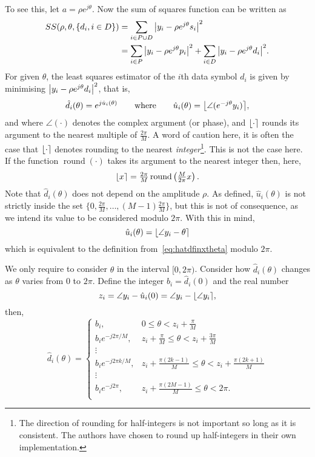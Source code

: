 \documentclass[a4paper,10pt]{article}
\begin{document}
To see this, let $a = \rho e^{j\theta}$.  Now the sum of squares function can be written as
\begin{align*}
SS(\rho, \theta, \{d_i, i \in D\}) &= \sum_{i \in P \cup D} {\left|  y_i - \rho e^{j\theta} s_i  \right|}^2  \\
&= \sum_{i \in P} {\left|  y_i - \rho e^{j\theta} p_i  \right|}^2 + \sum_{i \in D} {\left|  y_i - \rho e^{j\theta} d_i  \right|}^2.
\end{align*}
For given $\theta$, the least squares estimator of the $i$th data symbol $d_i$ is given by minimising ${\left|  y_i - \rho e^{j\theta} d_i  \right|}^2$, that is,
\begin{equation}\label{eq:hatdfinxtheta}
\hat{d}_i(\theta) = e^{j\hat{u}_i(\theta)} \qquad \text{where} \qquad \hat{u}_i(\theta) = {\left\lfloor \angle( e^{-j\theta}y_i) \right\rceil},
\end{equation}
and where $\angle(\cdot)$ denotes the complex argument (or phase), and ${\left\lfloor \cdot \right\rceil}$ rounds its argument to the nearest multiple of $\frac{2\pi}{M}$.  A word of caution here, it is often the case that ${\left\lfloor \cdot \right\rceil}$ denotes rounding to the nearest \emph{integer}\footnote{The direction of rounding for half-integers is not important so long as it is consistent.  The authors have chosen to round up half-integers in their own implementation.}.  This is not the case here.  If the function $\operatorname{round}(\cdot)$ takes its argument to the nearest integer then, here,
\[
{\left\lfloor x \right\rceil} = \tfrac{2\pi}{M}\operatorname{round}\left(\tfrac{M}{2\pi}x\right).
\] 
Note that $\hat{d}_i(\theta)$ does not depend on the amplitude $\rho$.  As defined, $\hat{u}_i(\theta)$ is not strictly inside the set $\{0, \tfrac{2\pi}{M}, \dots, (M-1)\tfrac{2\pi}{M}\}$, but this is not of consequence, as we intend its value to be considered modulo $2\pi$.  With this in mind,
\[
\hat{u}_i(\theta) = {\left\lfloor \angle{y_i} - \theta  \right\rceil}
\]
which is equivalent to the definition from~\eqref{eq:hatdfinxtheta} modulo $2\pi$.

We only require to consider $\theta$ in the interval $[0, 2\pi)$.  Consider how $\hat{d}_i(\theta)$ changes as $\theta$ varies from $0$ to $2\pi$.  Define the integer $b_i = \hat{d}_i(0)$ and the real number 
\[
z_i = \angle{y_i} - \hat{u}_i(0) = \angle{y_i} - {\left\lfloor \angle{y_i} \right\rceil},
\]
then,
\begin{equation}\label{eq:uicombos}
\hat{d}_i(\theta) = 
\begin{cases}
b_i, &  0 \leq \theta < z_i + \frac{\pi}{M} \\
b_i e^{-j2\pi/M}, & z_i + \frac{\pi}{M} \leq \theta < z_i + \frac{3\pi}{M} \\ 
\vdots & \\
b_i e^{-j2\pi k /M}, & z_i + \frac{\pi(2k - 1)}{M} \leq \theta < z_i + \frac{\pi(2k + 1)}{M}  \\ 
\vdots & \\
b_i e^{-j2\pi}, &  z_i + \frac{\pi(2M - 1)}{M} \leq \theta < 2\pi. \\
\end{cases}
\end{equation}
\end{document}

